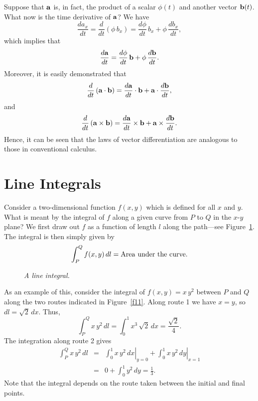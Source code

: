 Suppose that ${\bf a}$ is, in fact, the product of a scalar $\phi(t)$ and another vector
${\bf b}(t)$. What now is the time derivative of ${\bf a}$? We have
\begin{equation}
\frac{d a_x}{dt} = \frac{d}{dt}\!\left(\phi\, b_x\right) = \frac{d\phi}{dt}\, b_x + \phi \,
\frac{d b_x}{dt},
\end{equation}
which implies that
\begin{equation}
\frac{d {\bf a}}{dt} = \frac{d\phi}{dt}\, {\bf b} + \phi\, \frac{d {\bf b}}{dt}.
\end{equation}
Moreover, it is easily demonstrated that 
\begin{equation}
\frac{d}{dt}\left({\bf a}\cdot{\bf b}\right) = \frac{d{\bf a}}{dt}\cdot {\bf b} +{\bf a}\cdot\frac{d{\bf b}}{dt},
\end{equation}
and
\begin{equation}
\frac{d}{dt}\left({\bf a}\times{\bf b}\right) = \frac{d{\bf a}}{dt}\times{\bf b} + {\bf a}\times
\frac{d{\bf b}}{dt}.
\end{equation}
Hence, it can be seen that the laws of vector differentiation are analogous to those in 
conventional calculus.

\section{Line Integrals}
Consider a two-dimensional function $f(x,y)$ which is defined for all $x$ and $y$. 
What is meant by the integral of $f$ along a given curve from $P$ to $Q$ in the $x$-$y$ plane?
We first draw out $f$ as a function of length $l$ along the path---see Figure~\ref{f10}. The integral is then simply given
by
\begin{equation}
\int_{P}^Q f(x,y)\,dl = {\rm Area~under~the~curve}.
\end{equation}
\begin{figure}
\centerline{}
\caption{\em A line integral.}\label{f10}
\end{figure}

As an example of this, consider the integral of $f(x,y)= x\,y^2$ between $P$ and $Q$ along the
two routes indicated in Figure~\ref{f11}.
Along route 1 we have $x=y$, so $dl= \sqrt{2}\, dx$. Thus,
\begin{equation}
\int_P^Q x\,y^2\,dl = \int_0^1 x^3\,\sqrt{2} \,dx = \frac{\sqrt{2}}{4}.
\end{equation}
The integration along route 2 gives
\begin{eqnarray}
\int_P^Q x\,y^2\,dl &=& \left.\int_0^1 x\,y^2\,dx\right|_{y=0}+\left.\int_0^1 x\,y^2 \,dy
\right|_{x=1}\nonumber\\[0.5ex]
&=& 0 + \int_0^1 y^2\,dy = \frac{1}{3}.
\end{eqnarray}
Note that the integral depends on the route taken between the initial and final points. 

